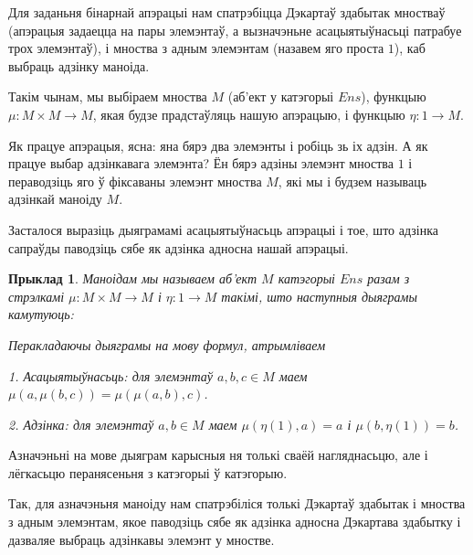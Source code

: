 \documentclass[a4paper,12pt]{book}
\newtheorem{example}{Прыклад}[section]
\begin{document}
Для заданьня бінарнай апэрацыі нам спатрэбіцца Дэкартаў здабытак
мностваў (апэрацыя задаецца на пары элемэнтаў, а вызначэньне
асацыятыўнасьці патрабуе трох элемэнтаў), і мноства з адным
элемэнтам (назавем яго проста $1$), каб выбраць адзінку маноіда.

Такім чынам, мы выбіраем мноства $M$ (аб'ект у катэгорыі $Ens$),
функцыю $\mu: M \times M \rightarrow M$, якая будзе прадстаўляць
нашую апэрацыю, і функцыю $\eta: 1 \rightarrow M$.

Як працуе апэрацыя, ясна: яна бярэ два элемэнты і робіць зь іх
адзін. А як працуе выбар адзінкавага элемэнта? Ён бярэ адзіны
элемэнт мноства $1$ і пераводзіць яго ў фіксаваны элемэнт мноства
$M$, які мы і будзем называць адзінкай маноіду $M$.

Засталося выразіць дыяграмамі асацыятыўнасьць апэрацыі і тое, што
адзінка сапраўды паводзіць сябе як адзінка адносна нашай апэрацыі.

\begin{example}
  Маноідам мы называем аб'ект $M$ катэгорыі $Ens$ разам з стрэлкамі
  $\mu: M \times M \rightarrow M$ і $\eta: 1 \rightarrow M$ такімі,
  што наступныя дыяграмы камутуюць:



  Перакладаючы дыяграмы на мову формул, атрымліваем

  1. Асацыятыўнасьць: для элемэнтаў $a, b, c \in M$ маем $\mu(a,
  \mu(b, c)) = \mu(\mu(a, b), c)$.

  2. Адзінка: для элемэнтаў $a, b \in M$ маем $\mu(\eta(1), a) = a$
  і $\mu(b, \eta(1)) = b$.
\end{example}

Азначэньні на мове дыяграм карысныя ня толькі сваёй нагляднасьцю,
але і лёгкасьцю перанясеньня з катэгорыі ў катэгорыю.

Так, для азначэньня маноіду нам спатрэбіліся толькі Дэкартаў
здабытак і мноства з адным элемэнтам, якое паводзіць сябе як
адзінка адносна Дэкартава здабытку і дазваляе выбраць адзінкавы
элемэнт у мностве.
\end{document}
